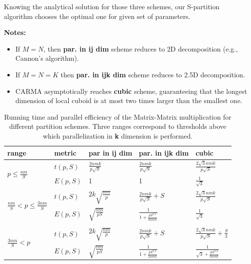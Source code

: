 \documentclass[sigplan,review,anonymous]{acmart}\settopmatter{printfolios=true,printccs=false,printacmref=false}
\begin{document}
Knowing the analytical solution for those three schemes, our S-partition 
algorithm chooses the optimal one for given set of parameters. 


\textbf{Notes:}

\begin{itemize}
	\item If $M = N$, then \textbf{par. in ij dim} scheme reduces to 2D 
	decomposition (e.g., Cannon's algorithm). 
	\item If $M = N = K$ then \textbf{par. in ijk dim} scheme reduces to 2.5D 
	decomposition.
	\item CARMA asymptotically reaches \textbf{cubic} scheme, guaranteeing that 
	the longest dimension of local cuboid is at most two times larger than the 
	smallest one.
\end{itemize}



\begin{table}[t]
\begin{tabular}{lllll}
\toprule
range & metric & par in \textbf{ij} dim & par. in \textbf{ijk} dim & cubic \\
\midrule 
\multirow{2}{*}{$p \le \frac{nm}{S}$} & $t(p,S)$ & $\frac{2nmk}{p\sqrt{S}}$ & $\frac{2nmk}{p\sqrt{S}}$ & $\frac{2\sqrt{3}nmk}{p\sqrt{S}}$ \\
& $E(p,S)$ & 1 & 1 & 	$\frac{1}{\sqrt{3}}$\\
\midrule 
\multirow{2}{*}{$\frac{nm}{S} < p \le \frac{3nm}{S}$} & $t(p,S)$ & $2k 
\sqrt{\frac{nm}{p}}$ & 
$\frac{2nmk}{p\sqrt{S}} + S$ & $\frac{2\sqrt{3}nmk}{p\sqrt{S}}$ 
\\
& $E(p,S)$ & $\sqrt{\frac{nm}{pS}}$ & $\frac{1}{1 + 
\frac{pS^{3/2}}{2nmk}}$ & 	$\frac{1}{\sqrt{3}}$ \\
\midrule \\
\multirow{2}{*}{$\frac{3nm}{S} < p$} & $t(p,S)$ & $2k 
\sqrt{\frac{nm}{p}}$ & 
$\frac{2nmk}{p\sqrt{S}} + S$ & $\frac{2\sqrt{3}nmk}{p\sqrt{S}} + 
\frac{S}{3}$\\
& $E(p,S)$ & $\sqrt{\frac{nm}{pS}}$ & $\frac{1}{1 + 
\frac{pS^{3/2}}{2nmk}}$ &	$\frac{1}{\sqrt{3} + 
\frac{pS^{3/2}}{6nmk}}$
\end{tabular}
\caption{Running time and parallel efficiency of the Matrix-Matrix 
multiplication for different partition schemes. Three ranges correspond 
to thresholds above which parallelization in \textbf{k} dimension is 
performed.}
\label{tab:mmmEfficiency}
\end{table}
\end{document}
